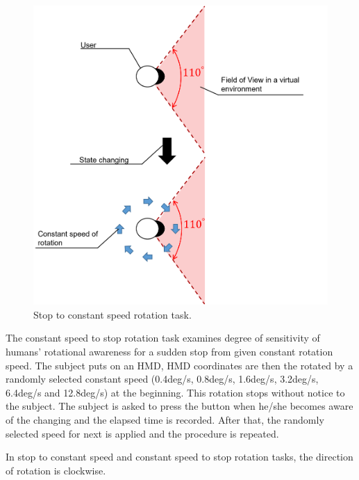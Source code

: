 \begin{figure}[H]\centering
	\includegraphics[width=1.0\textwidth]{Pictures/Equipment 1 Constant Speed task.png}%
	\caption{Stop to constant speed rotation task.}\label{fig:Equipment 1 Constant Speed task}%
\end{figure}
\newpage

The constant speed to stop rotation task examines degree of sensitivity of humans' rotational awareness for a sudden stop from given constant rotation speed. The subject puts on an HMD, HMD coordinates are then the rotated by a randomly selected constant speed (0.4deg/s, 0.8deg/s, 1.6deg/s, 3.2deg/s, 6.4deg/s and 12.8deg/s) at the beginning. This rotation stops without notice to the subject. The subject is asked to press the button when he/she becomes aware of the changing and the elapsed time is recorded. After that, the randomly selected speed for next is applied and the procedure is repeated.

In stop to constant speed and constant speed to stop rotation tasks, the direction of rotation is clockwise.

